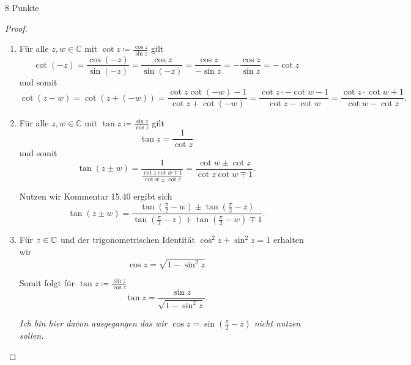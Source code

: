 \documentclass{problemset}
\begin{document}
\begin{problem}{8 Punkte}
\begin{proof}
\begin{enumerate}
        \item Für alle $z, w \in \mathbb{C}$ mit $\cot z \coloneqq \frac{\cos z}{\sin z}$ gilt
              \[
                  \cot (-z) = \frac{\cos (-z)}{\sin (-z)} = \frac{\cos z}{\sin (-z)} = \frac{\cos z}{ - \sin z} = - \frac{\cos z}{ \sin z} = - \cot z
              \]
              und somit
              \[
                  \cot(z - w) = \cot(z + (-w)) = \frac{\cot z \cot (-w) - 1}{\cot z + \cot (-w)} = \frac{\cot z \cdot -\cot w - 1}{\cot z - \cot w} = \frac{\cot z \cdot \cot w + 1}{\cot w  - \cot z}.
              \]

        \item Für alle $z, w \in \mathbb{C}$ mit $\tan z \coloneqq \frac{\sin z}{\cos z}$ gilt
              \[
                  \tan z = \frac{1}{\cot z}
              \] und somit
              \[
                  \tan (z \pm w) = \frac{1}{\frac{\cot z \cot w \mp 1}{\cot w \pm \cot z }} = \frac{\cot w \pm \cot z }{\cot z \cot w \mp 1}.
              \]

              Nutzen wir Kommentar 15.40  ergibt sich
              \[
                  \tan (z \pm w) = \frac{ \tan (\frac{\pi}{2} - w) \pm \tan (\frac{\pi}{2} - z)}{\tan (\frac{\pi}{2} - z) + \tan (\frac{\pi}{2} - w) \mp 1}.
              \]

        \item Für $z \in \mathbb{C}$ und der trigonometrischen Identität $\cos^2 z + \sin^2 z = 1$ erhalten wir \[
                  \cos z = \sqrt{ 1 - \sin^2 z }
              \]

              Somit folgt für $\tan z \coloneqq \frac{\sin z}{\cos z}$ \[
                  \tan z = \frac{\sin z}{\sqrt{1 - \sin^2 z}}.
              \]

              \textit{Ich bin hier davon ausgegangen das wir $\cos z = \sin (\frac{\pi}{2} - z)$ nicht nutzen sollen.}
    \end{enumerate}

\end{proof}

\end{problem}
\end{document}
